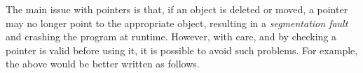 The main issue with pointers is that, if an object is deleted or moved, a pointer may no longer point to the appropriate object, resulting in a \emph{segmentation fault} and crashing the program at runtime. However, with care, and by checking a pointer is valid before using it, it is possible to avoid such problems. For example, the above would be better written as follows.
\begin{knitrout}\small
{}\color{fgcolor}\begin{kframe}
\noindent
\ttfamily
{}\hlopt{{*}\ }\hlopt{=\ }\hlstd{}\hlstd{}\hlopt{();}\hspace*{\fill}\\
\hlstd{}\hlstd{}\hlopt{(}\hlopt{==\ }\hlstd{}\hlstd{}\hlopt{)\ }\hlstd{}\hlstd{}\hlopt{();}\hspace*{\fill}\\
\hlopt{{*}\ }\hlopt{=\ }\hlopt{{-}$>$}\hlstd{}\hlstd{}\hlopt{();}\hspace*{\fill}\\
\hlstd{}\hlstd{}\hlopt{(}\hlopt{==\ }\hlstd{}\hlstd{}\hlopt{)\ }\hlstd{}\hlstd{}\hlopt{();}\hspace*{\fill}\\
\hlstd{}\hlstd{}\hlopt{(}\hlopt{{-}$>$}\hlstd{}\hlstd{}\hlopt{()\ $<$=\ }\hlopt{)\ }\hlstd{}\hlstd{}\hlopt{();}\hspace*{\fill}\\
\hlopt{{*}\ }\hlopt{=\ }\hlopt{{-}$>$}\hlstd{}\hlstd{}\hlopt{(}\hlopt{){-}$>$}\hlstd{}\hlstd{}\hlopt{();}\hspace*{\fill}\\
\hlstd{}\hlstd{}\hlopt{(}\hlopt{==\ }\hlstd{}\hlstd{}\hlopt{)\ }\hlstd{}\hlstd{}\hlopt{();}\hspace*{\fill}\\
\hlopt{{-}$>$}\hlstd{}\hlstd{}\hlopt{(}\hlopt{,\ }\hlopt{);}\hlstd{}\hspace*{\fill}
\mbox{}
\normalfont
\end{kframe}
\end{knitrout}

